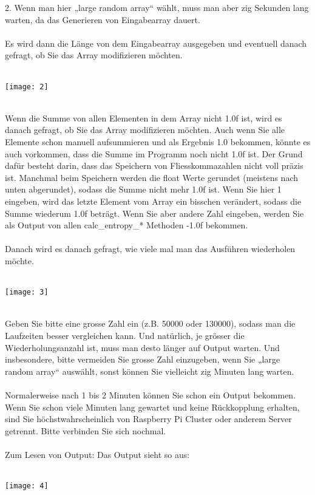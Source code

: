\documentclass[11pt]{article}
\begin{document}
{\LARGE 2.}	Wenn man hier „large random array“ w\"ahlt, muss man aber zig Sekunden lang warten, da das Generieren von Eingabearray dauert.\\\\
Es wird dann die L\"ange von dem Eingabearray ausgegeben und eventuell danach gefragt, ob Sie das Array modifizieren m\"ochten.\\\\
\centerline{\texttt{[image: 2]}}\\
Wenn die Summe von allen Elementen in dem Array nicht 1.0f ist, wird es danach gefragt, ob Sie das Array modifizieren m\"ochten. Auch wenn Sie alle Elemente schon manuell aufsummieren und als Ergebnis 1.0 bekommen, k\"onnte es auch vorkommen, dass die Summe im Programm noch nicht 1.0f ist. Der Grund daf\"ur besteht darin, dass das Speichern von Fliesskommazahlen nicht voll pr\"azis ist. Manchmal beim Speichern werden die float Werte gerundet (meistens nach unten abgerundet), sodass die Summe nicht mehr 1.0f ist. Wenn Sie hier 1 eingeben, wird das letzte Element vom Array ein bisschen ver\"andert, sodass die Summe wiederum 1.0f betr\"agt. Wenn Sie aber andere Zahl eingeben, werden Sie als Output von allen calc\_entropy\_* Methoden -1.0f bekommen.\\\\
Danach wird es danach gefragt, wie viele mal man das Ausf\"uhren wiederholen m\"ochte. \\\\
\centerline{\texttt{[image: 3]}}\\
Geben Sie bitte eine grosse Zahl ein (z.B. 50000 oder 130000), sodass man die Laufzeiten besser vergleichen kann. Und nat\"urlich, je gr\"osser die Wiederholungsanzahl ist, muss man desto l\"anger auf Output warten. Und insbesondere, bitte vermeiden Sie grosse Zahl einzugeben, wenn Sie „large random array“ ausw\"ahlt, sonst k\"onnen Sie vielleicht zig Minuten lang warten.\\\\
Normalerweise nach 1 bis 2 Minuten k\"onnen Sie schon ein Output bekommen. Wenn Sie schon viele Minuten lang gewartet und keine R\"uckkopplung erhalten, sind Sie h\"ochstwahrscheinlich von Raspberry Pi Cluster oder anderem Server getrennt. Bitte verbinden Sie sich nochmal.\\\\
Zum Lesen von Output: Das Output sieht so aus:\\\\
\centerline{\texttt{[image: 4]}}\\
\end{document}
